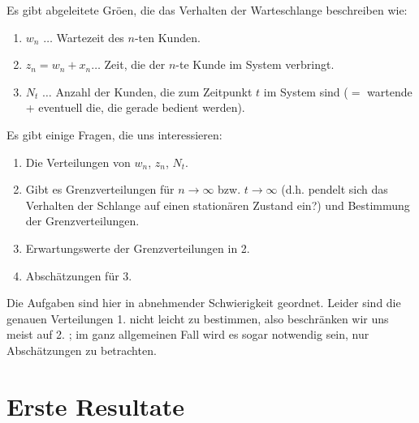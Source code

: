 Es gibt abgeleitete Grö\3en, die das Verhalten der Warteschlange
beschreiben wie:
\begin{enumerate}
\item $w_{n}$ $\dots$ Wartezeit des $n$-ten Kunden.
\item $z_{n} = w_{n} + x_{n} \dots$ Zeit, die der $n$-te Kunde im System
verbringt.
\item $N_{t}$ $\dots$ Anzahl der Kunden, die zum Zeitpunkt $t$ im System
sind ($=$ wartende + eventuell die, die gerade bedient werden).
\end{enumerate}
Es gibt einige Fragen, die uns interessieren:
\begin{enumerate}
\item Die Verteilungen von $w_{n}$, $z_{n}$, $N_{t}$.
\item Gibt es Grenzverteilungen für $n \rightarrow \infty$ bzw. $t
\rightarrow \infty$ (d.h. pendelt sich das Verhalten der Schlange auf
einen stationären Zustand ein?) und Bestimmung der Grenzverteilungen.
\item Erwartungswerte der Grenzverteilungen in 2.
\item Abschätzungen für 3.
\end{enumerate}
Die Aufgaben sind hier in abnehmender Schwierigkeit geordnet. Leider sind
die genauen Verteilungen 1. nicht leicht zu bestimmen, also beschränken
wir uns meist auf 2. ; im ganz allgemeinen Fall wird es sogar notwendig
sein, nur Abschätzungen zu betrachten.
\chapter{Erste Resultate}
